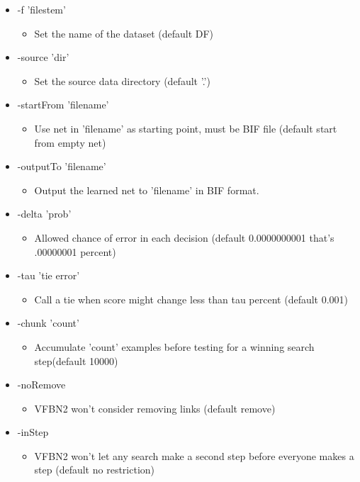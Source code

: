 \begin{itemize}
\item -f 'filestem'\begin{itemize}
\item Set the name of the dataset (default DF)\end{itemize}
\item -source 'dir'\begin{itemize}
\item Set the source data directory (default '.')\end{itemize}
\item -start\-From 'filename'\begin{itemize}
\item Use net in 'filename' as starting point, must be BIF file (default start from empty net)\end{itemize}
\item -output\-To 'filename'\begin{itemize}
\item Output the learned net to 'filename' in BIF format.\end{itemize}
\item -delta 'prob'\begin{itemize}
\item Allowed chance of error in each decision (default 0.0000000001 that's .00000001 percent)\end{itemize}
\item -tau 'tie error'\begin{itemize}
\item Call a tie when score might change less than tau percent (default 0.001)\end{itemize}
\item -chunk 'count'\begin{itemize}
\item Accumulate 'count' examples before testing for a winning search step(default 10000)\end{itemize}
\item -no\-Remove\begin{itemize}
\item VFBN2 won't consider removing links (default remove)\end{itemize}
\item -in\-Step\begin{itemize}
\item VFBN2 won't let any search make a second step before everyone makes a step (default no restriction)\end{itemize}

\end{itemize}
